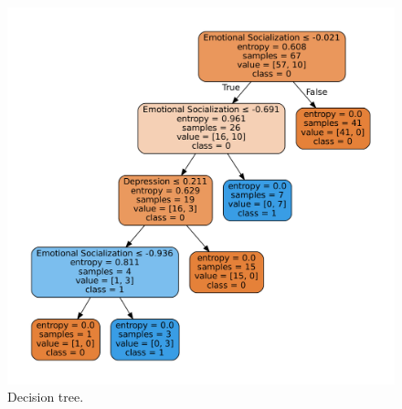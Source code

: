 \begin{figure}
    \includegraphics[width=\columnwidth]{figs/tree-graph.pdf}
    \caption{Decision tree.}
    \label{fig:dt}
\end{figure}


